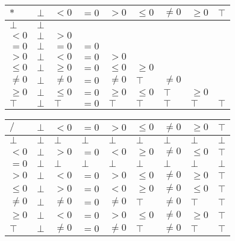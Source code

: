 \documentclass{article}
\begin{document}
        \begin{table}[]
            \begin{tabular}{|l|l|l|l|l|l|l|l|l|}
            \hline
            $*$     & $\bot$ & $<0$    & $=0$ & $>0$    & $\le 0$ & $\ne 0$ & $\ge 0$ & $\top$ \\ \hline
            $\bot$  & $\bot$ &         &      &         &         &         &         &        \\ \hline
            $<0$    & $\bot$ & $>0$    &      &         &         &         &         &        \\ \hline
            $=0$    & $\bot$ & $=0$    & $=0$ &         &         &         &         &        \\ \hline
            $>0$    & $\bot$ & $<0$    & $=0$ & $>0$    &         &         &         &        \\ \hline
            $\le 0$ & $\bot$ & $\ge 0$ & $=0$ & $\le 0$ & $\ge 0$ &         &         &        \\ \hline
            $\ne 0$ & $\bot$ & $\ne 0$ & $=0$ & $\ne 0$ & $\top$  & $\ne 0$ &         &        \\ \hline
            $\ge 0$ & $\bot$ & $\le 0$ & $=0$ & $\ge 0$ & $\le 0$ & $\top$  & $\ge 0$ &        \\ \hline
            $\top$  & $\bot$ & $\top$  & $=0$ & $\top$  & $\top$  & $\top$  & $\top$  & $\top$ \\ \hline
            \end{tabular}
            \end{table}


        \begin{table}[]
            \begin{tabular}{|l|l|l|l|l|l|l|l|l|}
            \hline
            $/$     & $\bot$ & $<0$    & $=0$   & $>0$    & $\le 0$ & $\ne 0$ & $\ge 0$ & $\top$ \\ \hline
            $\bot$  & $\bot$ & $\bot$  & $\bot$ & $\bot$  & $\bot$  & $\bot$  & $\bot$  & $\bot$ \\ \hline
            $<0$    & $\bot$ & $>0$    & $=0$   & $<0$    & $\ge 0$ & $\ne 0$ & $\le 0$ & $\top$ \\ \hline
            $=0$    & $\bot$ & $\bot$  & $\bot$ & $\bot$  & $\bot$  & $\bot$  & $\bot$  & $\bot$ \\ \hline
            $>0$    & $\bot$ & $<0$    & $=0$   & $>0$    & $\le 0$ & $\ne 0$ & $\ge 0$ & $\top$ \\ \hline
            $\le 0$ & $\bot$ & $>0$    & $=0$   & $<0$    & $\ge 0$ & $\ne 0$ & $\le 0$ & $\top$ \\ \hline
            $\ne 0$ & $\bot$ & $\ne 0$ & $=0$   & $\ne 0$ & $\top$  & $\ne 0$ & $\top$  & $\top$ \\ \hline
            $\ge 0$ & $\bot$ & $<0$    & $=0$   & $>0$    & $\le 0$ & $\ne 0$ & $\ge 0$ & $\top$ \\ \hline
            $\top$  & $\bot$ & $\ne 0$ & $=0$   & $\ne 0$ & $\top$  & $\ne 0$ & $\top$  & $\top$ \\ \hline
            \end{tabular}
            \end{table}
\end{document}
